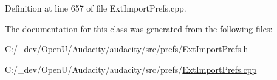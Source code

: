 Definition at line 657 of file Ext\+Import\+Prefs.\+cpp.



The documentation for this class was generated from the following files\+:\begin{DoxyCompactItemize}
\item 
C\+:/\+\_\+dev/\+Open\+U/\+Audacity/audacity/src/prefs/\hyperlink{_ext_import_prefs_8h}{Ext\+Import\+Prefs.\+h}\item 
C\+:/\+\_\+dev/\+Open\+U/\+Audacity/audacity/src/prefs/\hyperlink{_ext_import_prefs_8cpp}{Ext\+Import\+Prefs.\+cpp}\end{DoxyCompactItemize}
